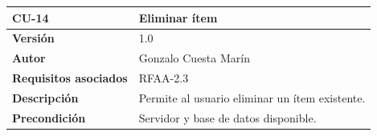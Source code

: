 \documentclass[
]{article}
\begin{document}
\begin{longtable}[]{@{}ll@{}}
\toprule
\begin{minipage}[b]{0.20\columnwidth}\raggedright
\textbf{CU-14}\strut
\end{minipage} & \begin{minipage}[b]{0.74\columnwidth}\raggedright
\textbf{Eliminar ítem}\strut
\end{minipage}\tabularnewline
\midrule
\endhead
\begin{minipage}[t]{0.20\columnwidth}\raggedright
\textbf{Versión}\strut
\end{minipage} & \begin{minipage}[t]{0.74\columnwidth}\raggedright
1.0\strut
\end{minipage}\tabularnewline
\begin{minipage}[t]{0.20\columnwidth}\raggedright
\textbf{Autor}\strut
\end{minipage} & \begin{minipage}[t]{0.74\columnwidth}\raggedright
Gonzalo Cuesta Marín\strut
\end{minipage}\tabularnewline
\begin{minipage}[t]{0.20\columnwidth}\raggedright
\textbf{Requisitos asociados}\strut
\end{minipage} & \begin{minipage}[t]{0.74\columnwidth}\raggedright
RFAA-2.3\strut
\end{minipage}\tabularnewline
\begin{minipage}[t]{0.20\columnwidth}\raggedright
\textbf{Descripción}\strut
\end{minipage} & \begin{minipage}[t]{0.74\columnwidth}\raggedright
Permite al usuario eliminar un ítem existente.\strut
\end{minipage}\tabularnewline
\begin{minipage}[t]{0.20\columnwidth}\raggedright
\textbf{Precondición}\strut
\end{minipage} & \begin{minipage}[t]{0.74\columnwidth}\raggedright
Servidor y base de datos disponible.


\end{minipage}
\end{longtable}
\end{document}
